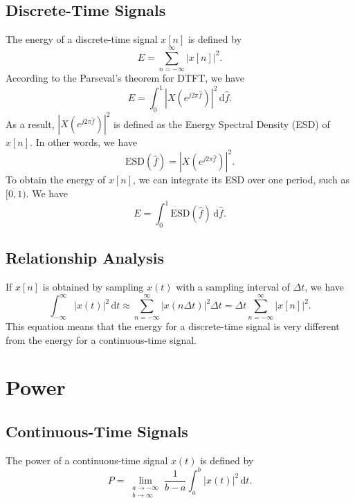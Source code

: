 \documentclass[journal,twoside]{IEEEtran}
\newcommand{\dd}{\,\mathrm{d}}
\begin{document}
\subsection{Discrete-Time Signals}

The energy of a discrete-time signal $x[n]$ is defined by
\begin{equation}
E = \sum_{n = -\infty}^{\infty}|x[n]|^2.
\end{equation}
According to the Parseval's theorem for DTFT, we have
\begin{equation}
E = \int_{0}^{1}|X(e^{j 2 \pi \hat{f}})|^2\dd \hat{f}.
\end{equation}
As a result, $|X(e^{j 2 \pi \hat{f}})|^2$ is defined as the Energy Spectral Density (ESD) of $x[n]$. In other words, we have
\begin{equation}
\mathrm{ESD}(\hat{f}) = |X(e^{j 2 \pi \hat{f}})|^2.
\end{equation}
To obtain the energy of $x[n]$, we can integrate its ESD over one period, such as $[0, 1)$. We have
\begin{equation}
E = \int_{0}^{1}\mathrm{ESD}(\hat{f})\dd \hat{f}.
\end{equation}

\subsection{Relationship Analysis}

If $x[n]$ is obtained by sampling $x(t)$ with a sampling interval of $\Delta t$, we have
\begin{equation}
\int_{-\infty}^{\infty}|x(t)|^2\dd t \approx \sum_{n=-\infty}^{\infty}|x(n \Delta t)|^2\Delta t = \Delta t \sum_{n=-\infty}^{\infty}|x[n]|^2.
\end{equation}
This equation means that the energy for a discrete-time signal is very different from the energy for a continuous-time signal.





\section{Power}
 
\subsection{Continuous-Time Signals}

The power of a continuous-time signal $x(t)$ is defined by
\begin{equation}
P = \lim_{\substack{a\rightarrow -\infty\\b\rightarrow \infty}}\frac{1}{b-a}\int_{a}^{b}|x(t)|^2\dd t.
\end{equation}
\end{document}
